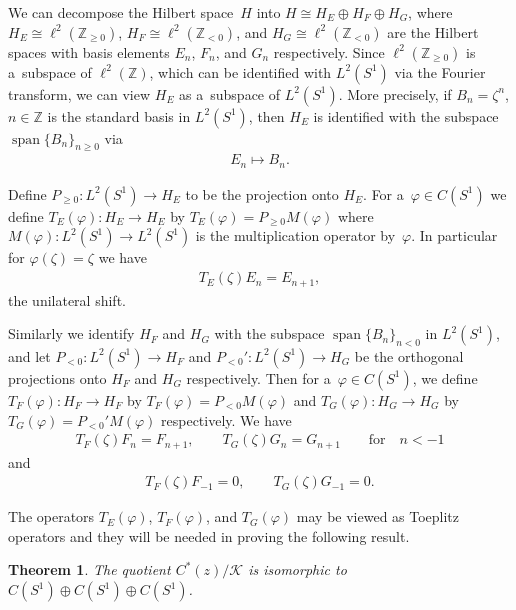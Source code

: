 \documentclass[pdftex]{sigma}
\numberwithin{equation}{section}
\newtheorem{Theorem}{Theorem}[section]
\begin{document}
We can decompose the Hilbert space~$H$ into $H \cong H_E \oplus H_F \oplus H_G$, where $H_E\cong\ell^2({\mathbb
Z}_{\ge0})$, $H_F\cong\ell^2({\mathbb Z}_{<0})$, and $H_G\cong\ell^2({\mathbb Z}_{<0})$ are the Hilbert spaces with
basis elements $E_n$, $F_n$, and $G_n$ respectively.
Since $\ell^2({\mathbb Z}_{\ge0})$ is a~subspace of $\ell^2({\mathbb Z})$, which can be identif\/ied with $L^2(S^1)$ via
the Fourier transform, we can view $H_E$ as a~subspace of $L^2(S^1)$.
More precisely, if $B_n=\zeta^n$, $n\in{\mathbb Z}$ is the standard basis in $L^2(S^1)$, then $H_E$ is identif\/ied with
the subspace $\operatorname{span}\{B_n\}_{n\geq 0}$ via
\begin{gather*}
E_n\mapsto B_n.
\end{gather*}

Def\/ine $P_{\ge0}: L^2(S^1)\to H_E$ to be the projection onto $H_E$.
For a~$\varphi\in C(S^1)$ we def\/ine $T_E(\varphi):H_E \to H_E$ by $T_E(\varphi)=P_{\ge0}M(\varphi)$ where
$M(\varphi):L^2(S^1)\to L^2(S^1)$ is the multiplication operator by~$\varphi$.
In particular for $\varphi(\zeta)=\zeta$ we have{\samepage
\begin{gather}
\label{teone}
T_E(\zeta)E_n=E_{n+1},
\end{gather}
the unilateral shift.}

Similarly we identify $H_F$ and $H_G$ with the subspace $\operatorname{span}\{B_n\}_{n< 0}$ in $L^2(S^1)$, and let $P_{<0}:L^2(S^1)\to
H_F$ and $P_{<0}':L^2(S^1)\to H_G$ be the orthogonal projections onto $H_F$ and $H_G$ respectively.
Then for a~$\varphi\in C(S^1)$, we def\/ine $T_F(\varphi):H_F \to H_F$ by $T_F(\varphi)=P_{<0}M(\varphi)$ and
$T_G(\varphi):H_G\to H_G$ by $T_G(\varphi)=P_{<0}'M(\varphi)$ respectively.
We have
\begin{gather}
\label{tfonf}
T_F(\zeta)F_n=F_{n+1},
\qquad
T_G(\zeta)G_n=G_{n+1}
\qquad
\text{for}
\quad
n<-1
\end{gather}
and
\begin{gather}
\label{tgong}
T_F(\zeta)F_{-1}=0,
\qquad
T_G(\zeta)G_{-1}=0.
\end{gather}

The operators $T_E(\varphi)$, $T_F(\varphi)$, and $T_G(\varphi)$ may be viewed as Toeplitz operators and they will be
needed in proving the following result.

\begin{Theorem}
\label{quotient_algebra}
The quotient $C^*(z)/\mathcal{K}$ is isomorphic to $C(S^1)\oplus C(S^1)\oplus C(S^1)$.
\end{Theorem}
\end{document}
